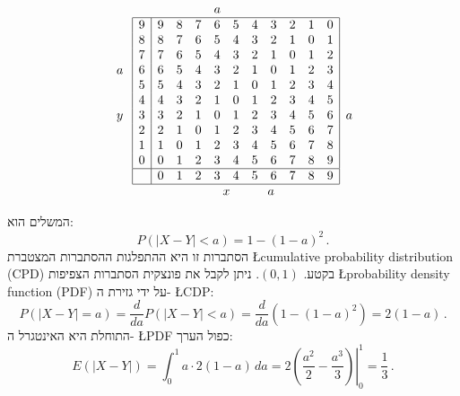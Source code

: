 \begin{table}[bt]
\[
\begin{array}{c}
\quad\\\\\\
a\\\\
\quad\\
y\\
\quad\\\quad\\\quad\\\quad
\end{array}
\begin{array}{|c|cccccccccc|}
\multicolumn{11}{l}{\qquad \qquad \qquad a}\\
\hline
9& 9 & 8 & 7 & 6 & 5 & 4 & 3 & 2 & 1 & 0  \\
8& 8 & 7 & 6 & 5 & 4 & 3 & 2 & 1 & 0 & 1  \\
7& 7 & 6 & 5 & 4 & 3 & 2 & 1 & 0 & 1 & 2  \\
6& 6 & 5 & 4 & 3 & 2 & 1 & 0 & 1 & 2 & 3  \\
5& 5 & 4 & 3 & 2 & 1 & 0 & 1 & 2 & 3 & 4  \\
4& 4 & 3 & 2 & 1 & 0 & 1 & 2 & 3 & 4 & 5  \\
3& 3 & 2 & 1 & 0 & 1 & 2 & 3 & 4 & 5 & 6  \\
2& 2 & 1 & 0 & 1 & 2 & 3 & 4 & 5 & 6 & 7  \\
1& 1 & 0 & 1 & 2 & 3 & 4 & 5 & 6 & 7 & 8  \\
0& 0 & 1 & 2 & 3 & 4 & 5 & 6 & 7 & 8 & 9  \\
\hline
&0 & 1 & 2 & 3 & 4 & 5 & 6 & 7 & 8 & 9  \\
\hline
\multicolumn{11}{c}{\quad \quad x\quad\quad\quad a}
\end{array}
\begin{array}{c}
\\\\\\
a\\\\
\end{array}
\]
\caption{התפלגות נקודות השבירה ב-%
$(0,1)\times (0,1)$}\label{t.rods}
\end{table}

המשלים הוא:
\[
P(|X-Y|<a)=1-(1-a)^2\,.
\]
הסתברות זו היא ההתפלגות ההסתברות המצטברת
\L{cumulative probability distribution (CPD)}
בקטע.
$(0,1)$.
ניתן לקבל את פונצקית הסתברות הצפיפות
\L{probability density function (PDF)}
על ידי גזירת ה-%
\L{CDP}:
\[
P(|X-Y|=a)= \frac{d}{da}P(|X-Y|<a) =
  \frac{d}{da}(1-(1-a)^2)=2(1-a)\,.
\]
התוחלת היא האינטגרל ה-%
\L{PDF}
כפול הערך:
\[
E(|X-Y|)= \int_{0}^{1} a\cdot2(1-a)\, da=
  2\left.\left(\frac{a^2}{2}-\frac{a^3}{3}\right)\right|_0^1=\frac{1}{3}\,.
\]

